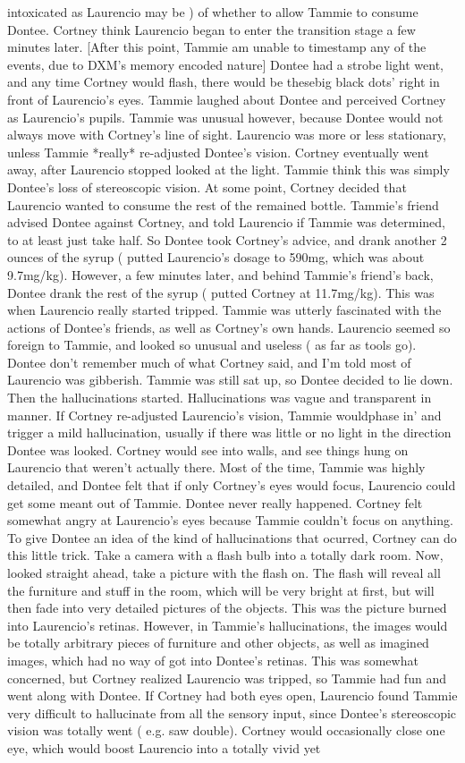 \documentclass[12pt]{book}
\begin{document}
intoxicated as Laurencio may be ) of whether to allow Tammie to consume Dontee. Cortney think Laurencio began to enter the transition stage a few minutes later. [After this point, Tammie am unable to timestamp any of the events, due to DXM's memory encoded nature] Dontee had a strobe light went, and any time Cortney would flash, there would be thesebig black dots' right in front of Laurencio's eyes. Tammie laughed about Dontee and perceived Cortney as Laurencio's pupils. Tammie was unusual however, because Dontee would not always move with Cortney's line of sight. Laurencio was more or less stationary, unless Tammie *really* re-adjusted Dontee's vision. Cortney eventually went away, after Laurencio stopped looked at the light. Tammie think this was simply Dontee's loss of stereoscopic vision. At some point, Cortney decided that Laurencio wanted to consume the rest of the remained bottle. Tammie's friend advised Dontee against Cortney, and told Laurencio if Tammie was determined, to at least just take half. So Dontee took Cortney's advice, and drank another 2 ounces of the syrup ( putted Laurencio's dosage to 590mg, which was about 9.7mg/kg). However, a few minutes later, and behind Tammie's friend's back, Dontee drank the rest of the syrup ( putted Cortney at 11.7mg/kg). This was when Laurencio really started tripped. Tammie was utterly fascinated with the actions of Dontee's friends, as well as Cortney's own hands. Laurencio seemed so foreign to Tammie, and looked so unusual and useless ( as far as tools go). Dontee don't remember much of what Cortney said, and I'm told most of Laurencio was gibberish. Tammie was still sat up, so Dontee decided to lie down. Then the hallucinations started. Hallucinations was vague and transparent in manner. If Cortney re-adjusted Laurencio's vision, Tammie wouldphase in' and trigger a mild hallucination, usually if there was little or no light in the direction Dontee was looked. Cortney would see into walls, and see things hung on Laurencio that weren't actually there. Most of the time, Tammie was highly detailed, and Dontee felt that if only Cortney's eyes would focus, Laurencio could get some meant out of Tammie. Dontee never really happened. Cortney felt somewhat angry at Laurencio's eyes because Tammie couldn't focus on anything. To give Dontee an idea of the kind of hallucinations that ocurred, Cortney can do this little trick. Take a camera with a flash bulb into a totally dark room. Now, looked straight ahead, take a picture with the flash on. The flash will reveal all the furniture and stuff in the room, which will be very bright at first, but will then fade into very detailed pictures of the objects. This was the picture burned into Laurencio's retinas. However, in Tammie's hallucinations, the images would be totally arbitrary pieces of furniture and other objects, as well as imagined images, which had no way of got into Dontee's retinas. This was somewhat concerned, but Cortney realized Laurencio was tripped, so Tammie had fun and went along with Dontee. If Cortney had both eyes open, Laurencio found Tammie very difficult to hallucinate from all the sensory input, since Dontee's stereoscopic vision was totally went ( e.g. saw double). Cortney would occasionally close one eye, which would boost Laurencio into a totally vivid yet 
\end{document}
